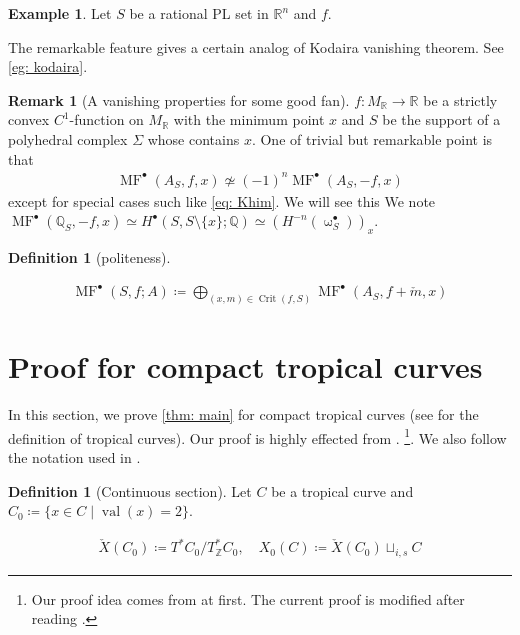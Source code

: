 \documentclass[a4paper,dvipdfmx,reqno,12pt]{amsart}
\theoremstyle{definition}
\newtheorem{Def}[Thm]{Definition}
\newtheorem{Eg}[Thm]{Example}
\newtheorem{Rmk}[Thm]{Remark}
\newcommand{\deq}{\coloneqq}
\newcommand{\R}{\mathbb{R}}%
\newcommand{\Q}{\mathbb{Q}}%
\newcommand{\Z}{\mathbb{Z}}%
\newcommand{\opn}[1]{\operatorname{#1}}
\numberwithin{equation}{section}
\begin{document}
\begin{Eg}



Let $S$ be a rational PL set in $\R^{n}$ and
$f$.

The remarkable feature gives a certain analog
of Kodaira vanishing theorem. See \cref{eg: kodaira}.
\end{Eg}



\begin{Rmk}[{A vanishing properties
for some good fan}]
$f\colon M_{\R}\to \R$ be a strictly convex
$C^{1}$-function on $M_{\R}$ with the minimum point $x$
 and $S$ be the support of 
a polyhedral complex $\Sigma$ whose contains $x$.
One of trivial but remarkable point is that
\begin{align}
\opn{MF}^{\bullet}(A_S,f,x)\not\simeq (-1)^{n}
\opn{MF}^{\bullet}(A_S,-f,x)
\end{align}
except for special cases such like \cref{eq: Khim}.
We will see this
We note $\opn{MF}^{\bullet}(\Q_S,-f,x) \simeq 
H^{\bullet}(S,S\setminus \{x\};\Q)\simeq 
(H^{-n}(\upomega_S^{\bullet}))_x$. 
\end{Rmk}

\begin{Def}[{politeness}]

\end{Def}

\begin{align}
\opn{MF}^{\bullet}(S,f;A)\deq 
\bigoplus_{(x,m)\in \opn{Crit}(f,S)} \opn{MF}^{\bullet}(A_S,f+\check{m},x)
\end{align}


\section{Proof for compact tropical curves}
In this section, we prove \cref{thm: main} for 
compact tropical curves
(see \cite{mikhalkinTropicalCurvesTheir2008a} 
for the definition of tropical curves).
Our proof is highly effected from 
\cite{knill2012graph,MR2676658,auroux2022lagrangian}.
\footnote{Our proof idea comes from 
\cite{knill2012graph,MR2676658} at first.  
The current proof is modified after reading 
\cite{auroux2022lagrangian}.}.
We also follow the notation used in 
\cite{auroux2022lagrangian}.

\begin{Def}[{Continuous section}]
Let $C$ be a tropical curve and 
$C_{0}\deq \{x\in C\mid \opn{val}(x)=2\}$.

\begin{align}
\check{X}(C_0)\deq T^{*}C_0/T^{*}_{\Z}C_0, \quad 
X_0(C)\deq \check{X}(C_0)\sqcup_{i,s}C
\end{align}

\end{Def}
\end{document}
